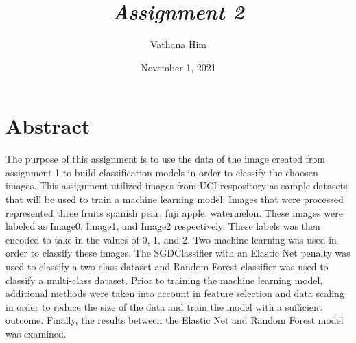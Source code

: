 \documentclass[12pt]{article}
\title{\Huge \bfseries \emph{Assignment 2}}
\author{Vathana Him}
\date{November 1, 2021}
\begin{document}
\maketitle
\section{Abstract}
\hspace*{10mm} The purpose of this assignment is to use the data of the image created from assignment 1 to build classification models in order to classify the choosen images. 
This assignment utilized images from UCI respository as sample datasets that will be used to train a machine learning model. 
Images that were processed represented three fruits spanish pear, fuji apple, watermelon. These images were labeled as Image0, Image1, and Image2 respectively. 
These labels was then encoded to take in the values of 0, 1, and 2. Two machine learning was used in order to classify these images. The SGDClassifier with an Elastic
Net penalty was used to classify a two-class dataset and Random Forest classifier was used to classify a multi-class dataset. Prior to training the machine learning model,
additional methods were taken into account in feature selection and data scaling in order to reduce the size of the data and train the model with a sufficient outcome.
Finally, the results between the Elastic Net and Random Forest model was examined. 
\end{document}
